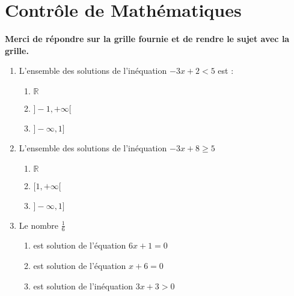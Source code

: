 \documentclass[oneside,twoside]{book}
\begin{document}
\chapter*{Contrôle de Mathématiques}

\let\MauvaiseReponse\null
\let\BonneReponse\null

{\bf Merci de répondre sur la grille fournie et de rendre le sujet avec la grille.}
\vspace{2em}
\begin{enumerate}




\item L'ensemble des solutions de l'inéquation $-3 x+2<5$ est :

\begin{enumerate}

\item\MauvaiseReponse $\mathbb{R}$

\item\BonneReponse $]-1,+\infty[$

\item\MauvaiseReponse $]-\infty, 1]$

\end{enumerate}

\item L'ensemble des solutions de l'inéquation $-3x+8 \geqslant 5$

\begin{enumerate}

\item\MauvaiseReponse $\mathbb{R}$

\item\MauvaiseReponse $[1,+\infty[$

\item\BonneReponse $]-\infty,1]$

\end{enumerate}





\item Le nombre $\frac{1}{6}$

\begin{enumerate}

\item\MauvaiseReponse est solution de l'équation $6x+1=0$

\item\MauvaiseReponse est solution de l'équation $x+6=0$

\item\BonneReponse est solution de l'inéquation $3x+3>0$


\end{enumerate}
\end{enumerate}
\end{document}
